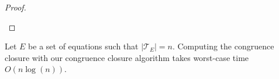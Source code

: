 \begin{proof}
\begin{itemize}
%
%
%

\end{itemize}
\end{proof}

\begin{proposition}[Runtime]
\label{prop:runtime}
Let $E$ be a set of equations such that $|\mathcal{T}_E| = n$.
Computing the congruence closure with our congruence closure algorithm takes worst-case time $O(n \log(n))$.

\end{proposition}

